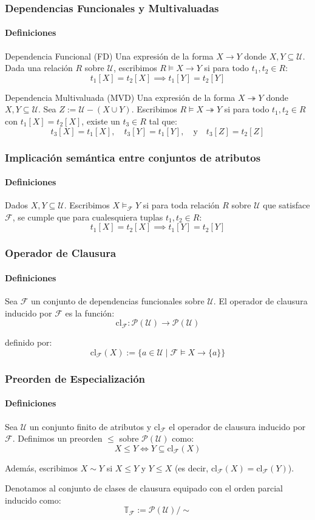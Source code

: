 \documentclass[aspectratio=169,12pt]{beamer}
\begin{document}
\begin{frame}
    \frametitle{Dependencias Funcionales y Multivaluadas}
    \framesubtitle{Definiciones}
    
    \small

    \begin{block}{Dependencia Funcional (FD)}
        Una expresión de la forma $X \rightarrow Y$ donde $X, Y \subseteq \mathcal{U}$.
        Dada una relación $R$ sobre $\mathcal{U}$, escribimos $R \vDash X \rightarrow Y$ si para todo $t_1, t_2 \in R$:
        \[t_1[X] = t_2[X] \implies t_1[Y] = t_2[Y]\]
    \end{block}

    \begin{block}{Dependencia Multivaluada (MVD)}
        Una expresión de la forma $X \twoheadrightarrow Y$ donde $X, Y \subseteq \mathcal{U}$.
        Sea $Z := \mathcal{U} - (X \cup Y)$. Escribimos $R \vDash X \twoheadrightarrow Y$ si para todo $t_1, t_2 \in R$ con $t_1[X] = t_2[X]$, existe un $t_3 \in R$ tal que:
        \[t_3[X] = t_1[X], \quad t_3[Y] = t_1[Y], \quad \text{y} \quad t_3[Z] = t_2[Z]\]
    \end{block}
\end{frame}

\begin{frame}
    \frametitle{Implicación semántica entre conjuntos de atributos}
    \framesubtitle{Definiciones}
    Dados $X, Y \subseteq \mathcal{U}$. Escribimos $X \vDash_{\mathcal{F}} Y$ si para toda relación $R$ sobre $\mathcal{U}$ que satisface $\mathcal{F}$, se cumple que para cualesquiera tuplas $t_1, t_2 \in R$:
    \[ t_1[X] = t_2[X] \implies t_1[Y] = t_2[Y] \]
\end{frame}


\begin{frame}
    \frametitle{Operador de Clausura}
    \framesubtitle{Definiciones}

    Sea $\mathcal{F}$ un conjunto de dependencias funcionales sobre $\mathcal{U}$. El operador de clausura inducido por $\mathcal{F}$ es la función:
    \[ \mathrm{cl}_{\mathcal{F}} : \mathcal{P}(\mathcal{U}) \rightarrow \mathcal{P}(\mathcal{U}) \]

    definido por:
    \[ \mathrm{cl}_{\mathcal{F}}(X) := \{a \in \mathcal{U} \mid \mathcal{F} \vDash X \rightarrow \{a\} \} \]
\end{frame}

\begin{frame}
    \frametitle{Preorden de Especialización}
    \framesubtitle{Definiciones}

    Sea $\mathcal{U}$ un conjunto finito de atributos y $\mathrm{cl}_{\mathcal{F}}$ el operador de clausura inducido por $\mathcal{F}$. Definimos un preorden $\leq$ sobre $\mathcal{P}(\mathcal{U})$ como:
    \[ X \leq Y \iff Y \subseteq \mathrm{cl}_{\mathcal{F}}(X) \]

    Además, escribimos $X \sim Y$ si $X \leq Y$ y $Y \leq X$ (es decir, $\mathrm{cl}_{\mathcal{F}}(X) = \mathrm{cl}_{\mathcal{F}}(Y)$). 
    
    Denotamos al conjunto de clases de clausura equipado con el orden parcial inducido como:
    \[ \mathbb{T}_{\mathcal{F}} := \mathcal{P}(\mathcal{U})/\sim \]
\end{frame}
\end{document}
